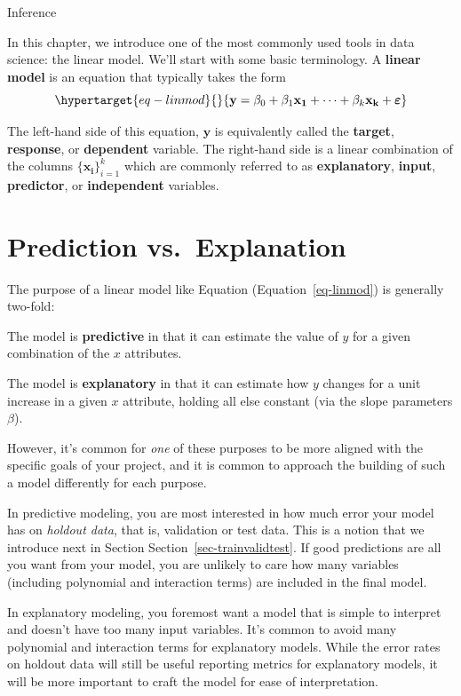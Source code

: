\documentclass[
  letterpaper,
  DIV=11,
  numbers=noendperiod]{scrreprt}
\begin{document}
Inference

In this chapter, we introduce one of the most commonly used tools in
data science: the linear model. We'll start with some basic terminology.
A \textbf{linear model} is an equation that typically takes the form
\begin{equation}\protect\hypertarget{eq-linmod}{}{
\mathbf{y} = \beta_0 + \beta_1\mathbf{x_1} + \dots + \beta_k\mathbf{x_k} + \boldsymbol \varepsilon 
}\label{eq-linmod}\end{equation}

The left-hand side of this equation, \(\mathbf{y}\) is equivalently
called the \textbf{target}, \textbf{response}, or \textbf{dependent}
variable. The right-hand side is a linear combination of the columns
\(\{\mathbf{x_i}\}_{i=1}^{k}\) which are commonly referred to as
\textbf{explanatory}, \textbf{input}, \textbf{predictor}, or
\textbf{independent} variables.

\hypertarget{sec-evp}{%
\section{Prediction vs.~Explanation}\label{sec-evp}}

The purpose of a linear model like Equation (Equation~\ref{eq-linmod})
is generally two-fold:

The model is \textbf{predictive} in that it can estimate the value of
\(y\) for a given combination of the \(x\) attributes.

The model is \textbf{explanatory} in that it can estimate how \(y\)
changes for a unit increase in a given \(x\) attribute, holding all else
constant (via the slope parameters \(\beta\)).

However, it's common for \emph{one} of these purposes to be more aligned
with the specific goals of your project, and it is common to approach
the building of such a model differently for each purpose.

In predictive modeling, you are most interested in how much error your
model has on \emph{holdout data}, that is, validation or test data. This
is a notion that we introduce next in Section
Section~\ref{sec-trainvalidtest}. If good predictions are all you want
from your model, you are unlikely to care how many variables (including
polynomial and interaction terms) are included in the final model.

In explanatory modeling, you foremost want a model that is simple to
interpret and doesn't have too many input variables. It's common to
avoid many polynomial and interaction terms for explanatory models.
While the error rates on holdout data will still be useful reporting
metrics for explanatory models, it will be more important to craft the
model for ease of interpretation.
\end{document}
